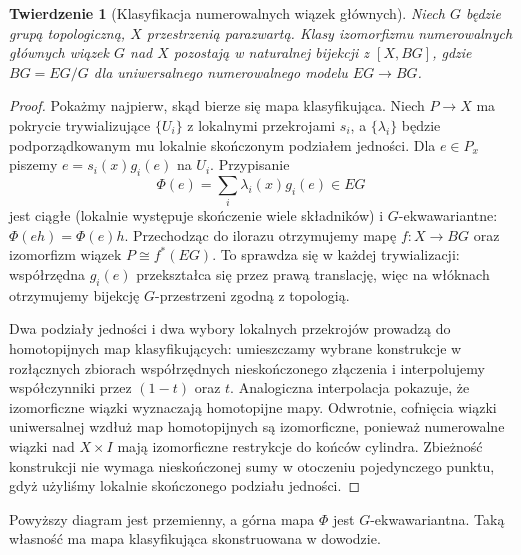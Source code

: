 \documentclass[11pt,a4paper,oneside]{report}
\theoremstyle{plain}
\newtheorem{twierdzenie}{Twierdzenie}[section]
\theoremstyle{definition}
\theoremstyle{remark}
\begin{document}
\begin{twierdzenie}[Klasyfikacja numerowalnych wiązek głównych]
\label{thm:BG-general-v6}
Niech $G$ będzie grupą topologiczną, $X$ przestrzenią
parazwartą. Klasy izomorfizmu numerowalnych głównych
wiązek $G$ nad $X$ pozostają w naturalnej bijekcji z
$[X,BG]$, gdzie $BG=EG/G$ dla uniwersalnego
numerowalnego modelu $EG\to BG$.
\end{twierdzenie}
\begin{proof}
Pokażmy najpierw, skąd bierze się mapa klasyfikująca.
Niech $P\to X$ ma pokrycie trywializujące $\{U_i\}$
z lokalnymi przekrojami $s_i$, a $\{\lambda_i\}$ będzie
podporządkowanym mu lokalnie skończonym podziałem jedności.
Dla $e\in P_x$ piszemy $e=s_i(x)g_i(e)$ na $U_i$.
Przypisanie
\[
\Phi(e)=\sum_i\lambda_i(x)g_i(e)\in EG
\]
jest ciągłe (lokalnie występuje skończenie wiele składników)
i $G$-ekwawariantne: $\Phi(eh)=\Phi(e)h$.
Przechodząc do ilorazu otrzymujemy mapę
$f:X\to BG$ oraz izomorfizm wiązek
$P\cong f^*(EG)$. To sprawdza się w każdej trywializacji:
współrzędna $g_i(e)$ przekształca się przez prawą
translację, więc na włóknach otrzymujemy bijekcję
$G$-przestrzeni zgodną z topologią.

Dwa podziały jedności i dwa wybory lokalnych przekrojów
prowadzą do homotopijnych map klasyfikujących:
umieszczamy wybrane konstrukcje w rozłącznych
zbiorach współrzędnych nieskończonego złączenia
i interpolujemy współczynniki przez $(1-t)$ oraz $t$.
Analogiczna interpolacja pokazuje, że izomorficzne
wiązki wyznaczają homotopijne mapy. Odwrotnie,
cofnięcia wiązki uniwersalnej wzdłuż map homotopijnych
są izomorficzne, ponieważ numerowalne wiązki nad
$X\times I$ mają izomorficzne restrykcje do końców
cylindra. Zbieżność konstrukcji nie wymaga nieskończonej
sumy w otoczeniu pojedynczego punktu, gdyż użyliśmy
lokalnie skończonego podziału jedności.
\end{proof}

\begin{center}
\end{center}
Powyższy diagram jest przemienny, a górna mapa
$\Phi$ jest $G$-ekwawariantna. Taką własność ma
mapa klasyfikująca skonstruowana w dowodzie.
\end{document}
